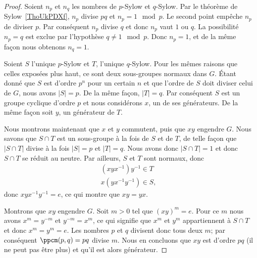 \begin{proof}
	Soient \( n_p\) et \( n_q\) les nombres de \( p\)-Sylow et \( q\)-Sylow. Par le théorème de Sylow~\ref{ThoUkPDXf}, \( n_p\) divise \( pq\) et \( n_p=1\mod p\). Le second point empêche \( n_p\) de diviser \( p\). Par conséquent \( n_p\) divise \( q\) et donc \( n_p\) vaut \( 1\) ou \( q\). La possibilité \( n_p=q\) est exclue par l'hypothèse \( q\neq 1\mod p\). Donc \( n_p=1\), et de la même façon nous obtenons \( n_q=1\).

	Soient \( S\) l'unique \( p\)-Sylow et \( T\), l'unique \( q\)-Sylow. Pour les mêmes raisons que celles exposées plus haut, ce sont deux sous-groupes normaux dans \( G\). Étant donné que \( S\) est d'ordre \( p^n\) pour un certain \( n\) et que l'ordre de \( S\) doit diviser celui de \( G\), nous avons \( |S|=p\). De la même façon, \( | T |=q\). Par conséquent \( S\) est un groupe cyclique d'ordre \( p\) et nous considérons \( x\), un de ses générateurs. De la même façon soit \( y\), un générateur de \( T\).

	Nous montrons maintenant que \( x\) et \( y\) commutent, puis que \( xy\) engendre \( G\). Nous savons que \( S\cap T\) est un sous-groupe à la fois de \( S\) et de \( T\), de telle façon que \( | S\cap T |\) divise à la fois \( | S |=p\) et \( | T |=q\). Nous avons donc \( | S\cap T |=1\) et donc \( S\cap T\) se réduit au neutre. Par ailleurs, \( S\) et \( T\) sont normaux, donc
	\begin{subequations}
		\begin{align}
			(xyx^{-1})y^{-1}\in T \\
			x(yx^{-1}y^{-1})\in S,
		\end{align}
	\end{subequations}
	donc \( xyx^{-1}y^{-1}=e\), ce qui montre que \( xy=yx\).

	Montrons que \( xy\) engendre \( G\). Soit \( m>0\) tel que \( (xy)^m=e\). Pour ce \( m\) nous avons \( x^m=y^{-m}\) et \( y^{-m}=x^m\), ce qui signifie que \( x^m\) et \( y^m\) appartiennent à \( S\cap T\) et donc \( x^m=y^m=e\). Les nombres \( p\) et \( q\) divisent donc tous deux \( m\); par conséquent \( \ppcm(p,q)=pq\) divise \( m\). Nous en concluons que \( xy\) est d'ordre \( pq\) (il ne peut pas être plus) et qu'il est alors générateur.


\end{proof}
